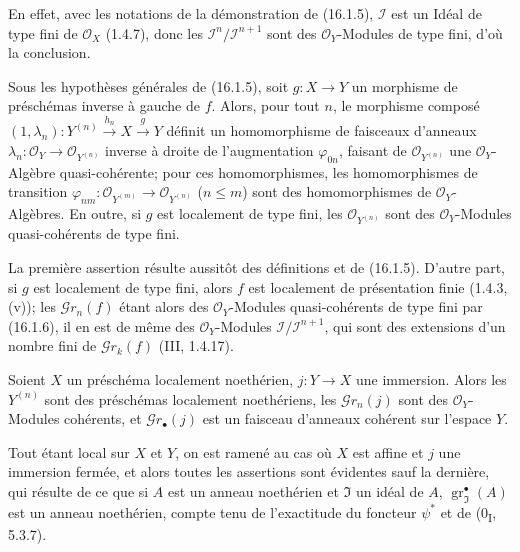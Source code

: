 En effet, avec les notations de la démonstration de (16.1.5), $\mathscr{I}$ est un
Idéal de type fini de $\mathcal{O}_X$ (1.4.7), donc les
$\mathscr{I}^n/\mathscr{I}^{n+1}$ sont des $\mathcal{O}_Y$-Modules de type fini,
d'où la conclusion.

\begin{corollary}[16.1.7]
\label{IV.16.1.7}
Sous les hypothèses générales de (16.1.5), soit $g:X\to Y$ un morphisme de
préschémas inverse à gauche de $f$. Alors, pour tout $n$, le morphisme composé
$(1,\lambda_n):Y^{(n)}\xrightarrow{h_n}X\xrightarrow{g}Y$ définit un
homomorphisme de faisceaux d'anneaux
$\lambda_n:\mathcal{O}_Y\to\mathcal{O}_{Y^{(n)}}$ inverse à droite de
l'augmentation $\varphi_{0n}$, faisant de $\mathcal{O}_{Y^{(n)}}$ une
$\mathcal{O}_Y$-Algèbre quasi-cohérente; pour ces homomorphismes, les
homomorphismes de transition
$\varphi_{nm}:\mathcal{O}_{Y^{(m)}}\to\mathcal{O}_{Y^{(n)}}$ ($n\leq m$) sont
des homomorphismes de $\mathcal{O}_Y$-Algèbres. En outre, si $g$ est localement
de type fini, les $\mathcal{O}_{Y^{(n)}}$ sont des $\mathcal{O}_Y$-Modules
quasi-cohérents de type fini.
\end{corollary}

La première assertion résulte aussitôt des définitions et de (16.1.5). D'autre
part, si $g$ est localement de type fini, alors $f$ est localement de
présentation finie (1.4.3, (v)); les $\mathscr{G}r_n(f)$ étant alors des
$\mathcal{O}_Y$-Modules quasi-cohérents de type fini par (16.1.6), il en est de
même des $\mathcal{O}_Y$-Modules
$\mathscr{I}/\mathscr{I}^{n+1}$, qui sont des extensions d'un nombre fini de
$\mathscr{G}r_k(f)$ (III, 1.4.17).

\begin{proposition}[16.1.8]
\label{IV.16.1.8}
Soient $X$ un préschéma localement noethérien, $j:Y\to X$ une immersion. Alors
les $Y^{(n)}$ sont des préschémas localement noethériens, les
$\mathscr{G}r_n(j)$ sont des $\mathcal{O}_Y$-Modules cohérents, et
$\mathscr{G}r_\bullet(j)$ est un faisceau d'anneaux cohérent sur l'espace $Y$.
\end{proposition}

Tout étant local sur $X$ et $Y$, on est ramené au cas où $X$ est affine et $j$
une immersion fermée, et alors toutes les assertions sont évidentes sauf la
dernière, qui résulte de ce que si $A$ est un anneau noethérien et
$\mathfrak{I}$ un idéal de $A$, $\operatorname{gr}_{\mathfrak{I}}^\bullet(A)$
est un anneau noethérien, compte tenu de l'exactitude du foncteur $\psi^*$ et de
(0\textsubscript{I}, 5.3.7).

